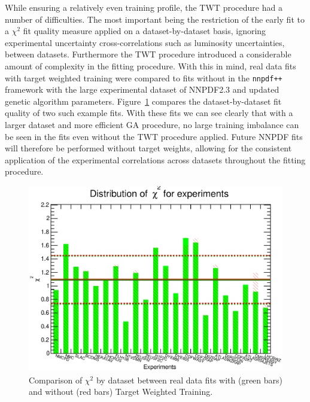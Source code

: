 While ensuring a relatively even training profile, the TWT procedure had a number of difficulties. The most important being the restriction of the early fit to a $\chi^2$ fit quality measure applied on a dataset-by-dataset basis, ignoring experimental uncertainty cross-correlations such as luminosity uncertainties, between datasets. Furthermore the TWT procedure introduced a considerable amount of complexity in the fitting procedure. With this in mind, real data fits with target weighted training were compared to fits without in the {\tt nnpdf++} framework with the large experimental dataset of NNPDF2.3 and updated genetic algorithm parameters. Figure~\ref{fig:twtvsnotwt} compares the dataset-by-dataset fit quality of two such example fits. With these fits we can see clearly that with a larger dataset and more efficient GA procedure, no large training imbalance can be seen in the fits even without the TWT procedure applied. Future NNPDF fits will therefore be performed without target weights, allowing for the consistent application of the experimental correlations across datasets throughout the fitting procedure.

\begin{figure}[!]
\centering
\includegraphics[width=1\textwidth]{7-PostLHC/figs/TWTvsnoTWT/chi2_histo.eps}
\caption[Comparison of $\chi^2$ by dataset between real data fits with and without Target Weighted Training]{Comparison of $\chi^2$ by dataset between real data fits with (green bars) and without (red bars) Target Weighted Training.}
\label{fig:twtvsnotwt}
\end{figure}

